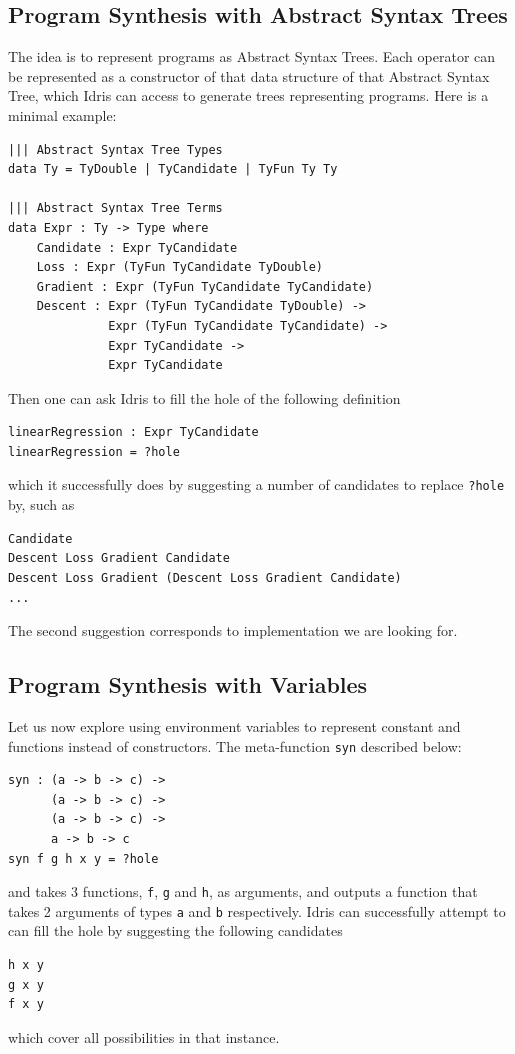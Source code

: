 \documentclass[]{report}
\begin{document}
\subsection{Program Synthesis with Abstract Syntax Trees}
\label{subsec:AST}
The idea is to represent programs as Abstract Syntax Trees.  Each
operator can be represented as a constructor of that data structure of
that Abstract Syntax Tree, which Idris can access to generate trees
representing programs.  Here is a minimal example:
\begin{verbatim}
||| Abstract Syntax Tree Types
data Ty = TyDouble | TyCandidate | TyFun Ty Ty

||| Abstract Syntax Tree Terms
data Expr : Ty -> Type where
    Candidate : Expr TyCandidate
    Loss : Expr (TyFun TyCandidate TyDouble)
    Gradient : Expr (TyFun TyCandidate TyCandidate)
    Descent : Expr (TyFun TyCandidate TyDouble) ->
              Expr (TyFun TyCandidate TyCandidate) ->
              Expr TyCandidate ->
              Expr TyCandidate
\end{verbatim}
Then one can ask Idris to fill the hole of the following definition
\begin{verbatim}
linearRegression : Expr TyCandidate
linearRegression = ?hole
\end{verbatim}
which it successfully does by suggesting a number of candidates to
replace \texttt{?hole} by, such as
\begin{verbatim}
Candidate
Descent Loss Gradient Candidate
Descent Loss Gradient (Descent Loss Gradient Candidate)
...
\end{verbatim}
The second suggestion corresponds to implementation we are looking
for.

\subsection{Program Synthesis with Variables}
Let us now explore using environment variables to represent constant
and functions instead of constructors.  The meta-function \texttt{syn}
described below:
\begin{verbatim}
syn : (a -> b -> c) ->
      (a -> b -> c) ->
      (a -> b -> c) ->
      a -> b -> c
syn f g h x y = ?hole
\end{verbatim}
and takes 3 functions, \texttt{f}, \texttt{g} and \texttt{h}, as
arguments, and outputs a function that takes 2 arguments of types
\texttt{a} and \texttt{b} respectively.  Idris can successfully
attempt to can fill the hole by suggesting the following candidates
\begin{verbatim}
h x y
g x y
f x y
\end{verbatim}
which cover all possibilities in that instance.
\end{document}

